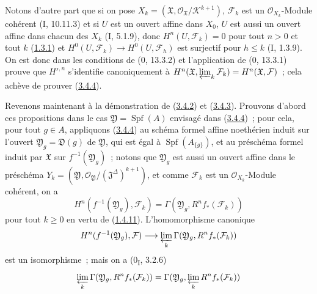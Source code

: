 Notons d'autre part que si on pose
$X_k=(\mathfrak X,\mathcal O_{\mathfrak X}/\mathcal K^{k+1})$,
$\mathcal F_k$ est un $\mathcal O_{X_k}$-Module cohérent (I, 10.11.3) et si
$U$ est un ouvert affine dans $X_0$, $U$ est aussi un ouvert affine dans
chacun des $X_k$ (I, 5.1.9), donc $H^n(U,\mathcal F_k)=0$ pour tout $n>0$ et
tout $k$ (\hyperref[III.1.3.1-fr]{1.3.1}) et
$H^0(U,\mathcal F_k)\to H^0(U,\mathcal F_h)$ est surjectif pour $h\leq k$
(I, 1.3.9). On est donc dans les conditions de (0, 13.3.2) et l'application
de (0, 13.3.1) prouve que $H'^{,n}$ s'identifie canoniquement à
$H^n(\mathfrak X,\varprojlim_k\mathcal F_k)=H^n(\mathfrak X,\mathcal F)$~;
cela achève de prouver (\hyperref[III.3.4.4-fr]{3.4.4}).

\begin{env}[3.4.5]
\label{III.3.4.5-fr}
Revenons maintenant à la démonstration de (\hyperref[III.3.4.2-fr]{3.4.2})
et (\hyperref[III.3.4.3-fr]{3.4.3}). Prouvons d'abord ces propositions dans
le cas $\mathfrak Y=\operatorname{Spf}(A)$ envisagé dans
(\hyperref[III.3.4.4-fr]{3.4.4})~; pour cela, pour tout $g\in A$, appliquons
(\hyperref[III.3.4.4-fr]{3.4.4}) au schéma formel affine noethérien induit
sur l'ouvert $\mathfrak Y_g=\mathfrak D(g)$ de $\mathfrak Y$, qui est égal à
$\operatorname{Spf}(A_{\{g\}})$, et au préschéma formel induit par
$\mathfrak X$ sur $f^{-1}(\mathfrak Y_g)$~; notons que $\mathfrak Y_g$ est
aussi un ouvert affine dans le préschéma
$Y_k=(\mathfrak Y,\mathcal O_{\mathfrak Y}/(\mathfrak J^\Delta)^{k+1})$,
et comme $\mathcal F_k$ est un $\mathcal O_{X_k}$-Module cohérent, on a
\[
H^n(f^{-1}(\mathfrak Y_g),\mathcal F_k)
=\Gamma(\mathfrak Y_g,R^nf_*(\mathcal F_k))
\]
pour tout $k\geq0$ en vertu de
(\hyperref[III.1.4.11-fr]{1.4.11}). L'homomorphisme canonique
\[
H^n(f^{-1}(\mathfrak Y_g),\mathcal F)
\longrightarrow\varprojlim_k\Gamma(\mathfrak Y_g,R^nf_*(\mathcal F_k))
\]
est un isomorphisme~; mais on a (0\textsubscript{I}, 3.2.6)
\[
\varprojlim_k\Gamma(\mathfrak Y_g,R^nf_*(\mathcal F_k))
=\Gamma(\mathfrak Y_g,\varprojlim_kR^nf_*(\mathcal F_k))
\]


\end{env}
